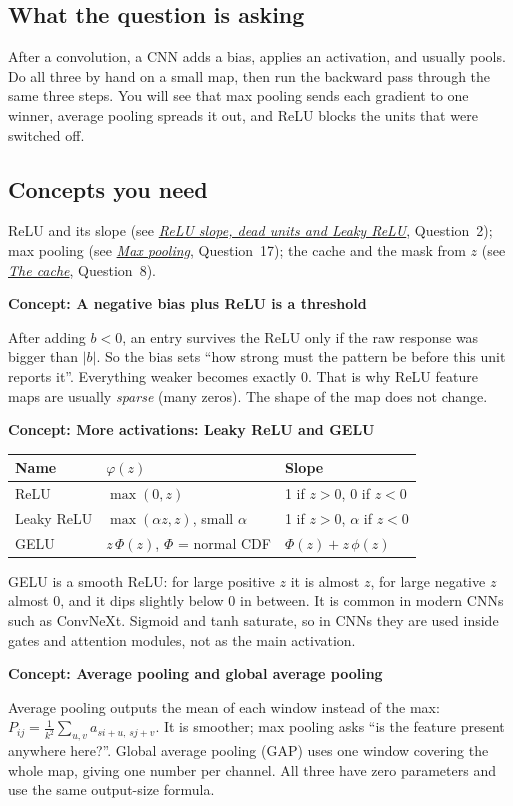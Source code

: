 \documentclass[12pt,a4paper]{article}
\newcommand{\concept}[2]{\par\medskip\phantomsection\label{#1}{\large\bfseries\color{blue!50!black} Concept: #2}\par}
\newcommand{\seeconcept}[3]{(see \hyperref[#1]{\textit{#2}}, Question~#3)}
\begin{document}
\subsection*{What the question is asking}
After a convolution, a CNN adds a bias, applies an activation, and usually pools. Do all three by hand on a small map, then run the backward pass through the same three steps. You will see that max pooling sends each gradient to one winner, average pooling spreads it out, and ReLU blocks the units that were switched off.

\subsection*{Concepts you need}
ReLU and its slope \seeconcept{c:reluderiv}{ReLU slope, dead units and Leaky ReLU}{2}; max pooling \seeconcept{c:maxpool}{Max pooling}{17}; the cache and the mask from $z$ \seeconcept{c:cache}{The cache}{8}.

\concept{c:biasthresh}{A negative bias plus ReLU is a threshold}
After adding $b<0$, an entry survives the ReLU only if the raw response was bigger than $|b|$. So the bias sets ``how strong must the pattern be before this unit reports it''. Everything weaker becomes exactly 0. That is why ReLU feature maps are usually \emph{sparse} (many zeros). The shape of the map does not change.

\concept{c:acts2}{More activations: Leaky ReLU and GELU}
\begin{center}
\begin{tabular}{@{}lll@{}}
\toprule
Name & $\varphi(z)$ & Slope\\
\midrule
ReLU & $\max(0,z)$ & 1 if $z>0$, 0 if $z<0$\\
Leaky ReLU & $\max(\alpha z,z)$, small $\alpha$ & 1 if $z>0$, $\alpha$ if $z<0$\\
GELU & $z\,\Phi(z)$, $\Phi$ = normal CDF & $\Phi(z)+z\,\phi(z)$\\
\bottomrule
\end{tabular}
\end{center}
GELU is a smooth ReLU: for large positive $z$ it is almost $z$, for large negative $z$ almost 0, and it dips slightly below 0 in between. It is common in modern CNNs such as ConvNeXt. Sigmoid and tanh saturate, so in CNNs they are used inside gates and attention modules, not as the main activation.

\concept{c:avgpool}{Average pooling and global average pooling}
Average pooling outputs the mean of each window instead of the max: $P_{ij}=\frac{1}{k^2}\sum_{u,v}a_{si+u,\,sj+v}$. It is smoother; max pooling asks ``is the feature present anywhere here?''. Global average pooling (GAP) uses one window covering the whole map, giving one number per channel. All three have zero parameters and use the same output-size formula.
\end{document}

